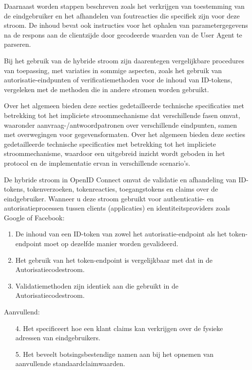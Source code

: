 Daarnaast worden stappen beschreven zoals het verkrijgen van toestemming van de eindgebruiker en het afhandelen van foutreacties die specifiek zijn voor deze stroom. De inhoud bevat ook instructies voor het ophalen van parametergegevens na de respons aan de clientzijde door gecodeerde waarden van de User Agent te parseren.

Bij het gebruik van de hybride stroom zijn daarentegen vergelijkbare procedures van toepassing, met variaties in sommige aspecten, zoals het gebruik van autorisatie-eindpunten of verificatiemethoden voor de inhoud van ID-tokens, vergeleken met de methoden die in andere stromen worden gebruikt.

Over het algemeen bieden deze secties gedetailleerde technische specificaties met betrekking tot het impliciete stroommechanisme dat verschillende fasen omvat, waaronder aanvraag-/antwoordpatronen over verschillende eindpunten, samen met overwegingen voor gegevensformaten.
Over het algemeen bieden deze secties gedetailleerde technische specificaties met betrekking tot het impliciete stroommechanisme, waardoor een uitgebreid inzicht wordt geboden in het protocol en de implementatie ervan in verschillende scenario's.

De hybride stroom in OpenID Connect omvat de validatie en afhandeling van ID-tokens, tokenverzoeken, tokenreacties, toegangstokens en claims over de eindgebruiker. Wanneer u deze stroom gebruikt voor authenticatie- en autorisatieprocessen tussen clients (applicaties) en identiteitsproviders zoals Google of Facebook:

\begin{enumerate}
  \item De inhoud van een ID-token van zowel het autorisatie-endpoint als het token-endpoint moet op dezelfde manier worden gevalideerd.
  \item Het gebruik van het token-endpoint is vergelijkbaar met dat in de Autorisatiecodestroom.
  \item Validatiemethoden zijn identiek aan die gebruikt in de Autorisatiecodestroom.
\end{enumerate}

Aanvullend:
\begin{enumerate}
  \item[4.] Het specificeert hoe een klant claims kan verkrijgen over de fysieke adressen van eindgebruikers.
  \item[5.] Het beveelt botsingsbestendige namen aan bij het opnemen van aanvullende standaardclaimwaarden.
\end{enumerate}

